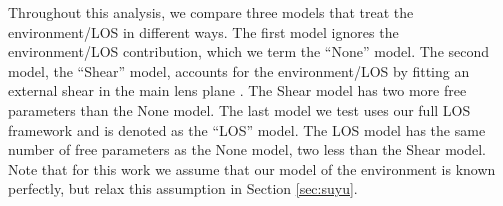 Throughout this analysis, we compare three models that treat the environment/LOS in different ways. The first model ignores the environment/LOS contribution, which we term the ``None'' model. The second model, the ``Shear'' model, accounts for the environment/LOS by fitting an external shear in the main lens plane \citep[e.g.,][]{Suyu13}. The Shear model has two more free parameters than the None model. The last model we test uses our full LOS framework and is denoted as the ``LOS'' model. The LOS model has the same number of free parameters as the None model, two less than the Shear model. Note that for this work we assume that our model of the environment is known perfectly, but relax this assumption in Section \ref{sec:suyu}.
  